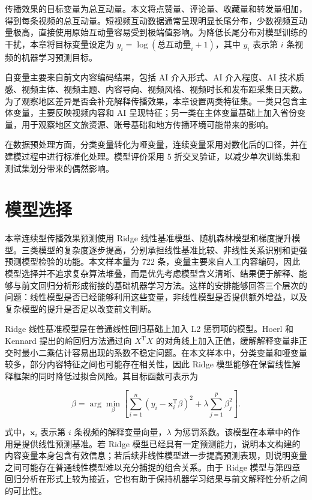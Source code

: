 传播效果的目标变量为总互动量。本文将点赞量、评论量、收藏量和转发量相加，得到每条视频的总互动量。短视频互动数据通常呈现明显长尾分布，少数视频互动量极高，直接使用原始互动量容易受到极端值影响。为降低长尾分布对模型训练的干扰，本章将目标变量设定为 $y_i=\log(\text{总互动量}_i+1)$，其中 $y_i$ 表示第 $i$ 条视频的机器学习预测目标。

自变量主要来自前文内容编码结果，包括 AI 介入形式、AI 介入程度、AI 技术质感、视频主体、视频主题、内容导向、视频风格、视频时长和发布距采集日天数。为了观察地区差异是否会补充解释传播效果，本章设置两类特征集。一类只包含主体变量，主要反映视频内容和 AI 呈现特征；另一类在主体变量基础上加入省份变量，用于观察地区文旅资源、账号基础和地方传播环境可能带来的影响。

在数据预处理方面，分类变量转化为哑变量，连续变量采用对数化后的口径，并在建模过程中进行标准化处理。模型评价采用 5 折交叉验证，以减少单次训练集和测试集划分带来的偶然影响。

\section{模型选择}

本章连续型传播效果预测使用 Ridge 线性基准模型、随机森林模型和梯度提升模型。三类模型的复杂度逐步提高，分别承担线性基准比较、非线性关系识别和更强预测模型检验的功能。本文样本量为 722 条，变量主要来自人工内容编码，因此模型选择并不追求复杂算法堆叠，而是优先考虑模型含义清晰、结果便于解释、能够与前文回归分析形成衔接的基础机器学习方法。这样的安排能够回答三个层次的问题：线性模型是否已经能够利用这些变量，非线性模型是否提供额外增益，以及复杂模型的提升是否足以改变前文判断。

Ridge 线性基准模型是在普通线性回归基础上加入 L2 惩罚项的模型。Hoerl 和 Kennard 提出的岭回归方法通过向 $X^{\mathrm{T}}X$ 的对角线上加入正值，缓解解释变量非正交时最小二乘估计容易出现的系数不稳定问题\cite{hoerl1970ridge}。在本文样本中，分类变量和哑变量较多，部分内容特征之间也可能存在相关性，因此 Ridge 模型能够在保留线性解释框架的同时降低过拟合风险。其目标函数可表示为
\begin{compactformula}
\[
\hat{\beta}=\arg\min_{\beta}\left[\sum_{i=1}^{n}(y_i-\mathbf{x}_i^{\mathrm{T}}\beta)^2+\lambda\sum_{j=1}^{p}\beta_j^2\right].
\]
\end{compactformula}
式中，$\mathbf{x}_i$ 表示第 $i$ 条视频的解释变量向量，$\lambda$ 为惩罚系数。该模型在本章中的作用是提供线性预测基准。若 Ridge 模型已经具有一定预测能力，说明本文构建的内容变量本身包含有效信息；若后续非线性模型进一步提高预测表现，则说明变量之间可能存在普通线性模型难以充分捕捉的组合关系。由于 Ridge 模型与第四章回归分析在形式上较为接近，它也有助于保持机器学习结果与前文解释性分析之间的可比性。

